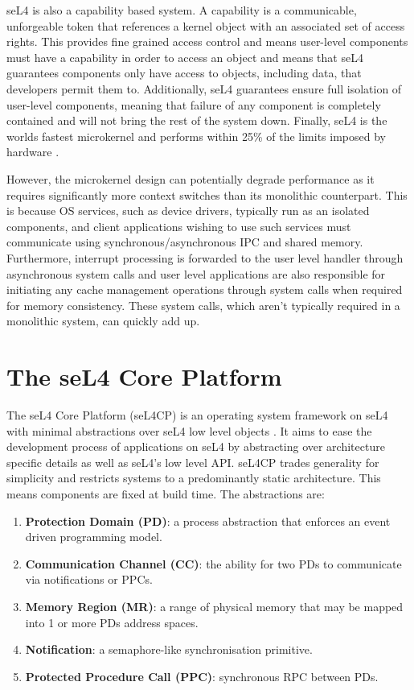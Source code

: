 seL4 is also a capability based system. A capability is a communicable, unforgeable token that 
references a kernel object with an associated set of access rights. This provides fine grained access control
and means user-level components must have a capability in order to access an object and means that seL4
guarantees components only have access to objects, including data, that developers permit them to.
Additionally, seL4 guarantees ensure full isolation of user-level components, meaning that
failure of any component is completely contained and will not bring the rest of the system down. 
Finally, seL4 is the worlds fastest microkernel and performs within 25\%
of the limits imposed by hardware \cite{Mi_LYWC_19}. 

However, the microkernel design can potentially degrade performance as it requires
significantly more context switches than its monolithic counterpart. This is because OS services,
such as device drivers, typically run as an isolated components, and client
applications wishing to use such services must communicate using synchronous/asynchronous
IPC and shared memory. Furthermore, interrupt processing is forwarded to the user level handler
through asynchronous system calls and user level applications are also responsible for initiating
any cache management operations through system calls when required
for memory consistency. These system calls, which aren't typically required in a monolithic
system, can quickly add up. 

\section{The seL4 Core Platform}
The seL4 Core Platform (seL4CP) is an operating system framework on seL4 with minimal abstractions over seL4 low level
objects \cite{Heiser_PCVL_22}. It aims to ease the development process of applications on seL4 by abstracting over
architecture specific details as well as seL4's low level API. seL4CP trades generality for simplicity and 
restricts systems to a predominantly static architecture. This means components are fixed at build time. 
The abstractions are:
\begin{enumerate}
    \item \textbf{Protection Domain (PD)}: a process abstraction that enforces an event driven programming model.
    \item \textbf{Communication Channel (CC)}: the ability for two PDs to communicate via notifications or PPCs.
    \item \textbf{Memory Region (MR)}: a range of physical memory that may be mapped into 1 or more PDs address spaces. 
    \item \textbf{Notification}: a semaphore-like synchronisation primitive. 
    \item \textbf{Protected Procedure Call (PPC)}: synchronous RPC between PDs. 
\end{enumerate}

